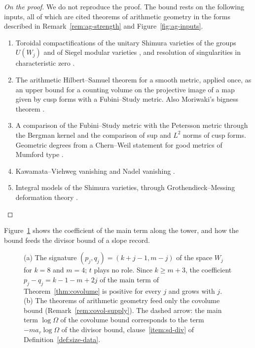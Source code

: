 \documentclass[11pt]{amsbook}
\theoremstyle{plain}
\theoremstyle{definition}
\theoremstyle{remark}
\numberwithin{equation}{section}
\numberwithin{figure}{chapter}
\numberwithin{table}{chapter}
\begin{document}
\begin{proof}[On the proof]
We do not reproduce the proof. The bound rests on the following
inputs, all of which are cited theorems of arithmetic geometry in the
forms described in Remark~\ref{rem:ag-strength} and
Figure~\ref{fig:ag-inputs}.
\begin{enumerate}[label=(\arabic*)]
\item Toroidal compactifications of the unitary Shimura varieties of
the groups $U(W_j)$ and of Siegel modular varieties
\cite{FaltingsChai1990,Lan2013}, and resolution of singularities in
characteristic zero \cite{Hironaka1964}.
\item The arithmetic Hilbert--Samuel theorem
\cite{GilletSoule1992,AbbesBouche1995} for a smooth metric, applied
once, as an upper bound for a counting volume on the projective image
of a map given by cusp forms with a Fubini--Study metric. Also
Moriwaki's bigness theorem \cite{Moriwaki2009}.
\item A comparison of the Fubini--Study metric with the Petersson
metric through the Bergman kernel and the comparison of sup and $L^2$
norms of cusp forms. Geometric degrees from a Chern--Weil
statement for good metrics of Mumford type \cite{Mumford1977}.
\item Kawamata--Viehweg vanishing \cite{Kawamata1982,Viehweg1982} and
Nadel vanishing \cite{Nadel1990}.
\item Integral models of the Shimura varieties, through
Grothendieck--Messing deformation theory \cite{Messing1972}.
\end{enumerate}
\end{proof}

\noindent Figure~\ref{fig:covolume-main} shows the coefficient of the
main term along the tower, and how the bound feeds the divisor bound
of a slope record.

\begin{figure}[htbp]
\centering

\caption{(a) The signature $(p_j,q_j)=(k+j-1,m-j)$ of the space $W_j$ for
$k=8$ and $m=4$; $t$ plays no role. Since $k\ge m+3$, the coefficient
$p_j-q_j=k-1-m+2j$ of the main term of Theorem~\ref{thm:covolume} is
positive for every $j$ and grows with $j$. (b) The theorems of
arithmetic geometry feed only the covolume bound
(Remark~\ref{rem:covol-supply}). The dashed arrow: the main term
$\log\Omega$ of the covolume bound corresponds to the term
$-ma_\tau\log\Omega$ of the divisor bound, clause~\ref{item:sd-div} of
Definition~\ref{def:size-data}.}
\label{fig:covolume-main}
\end{figure}
\end{document}
